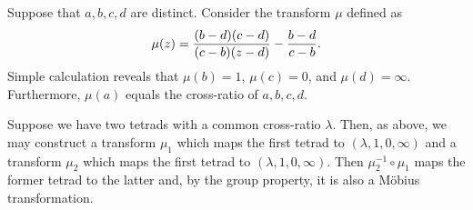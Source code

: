 \documentclass[12pt]{article}
\begin{document}
Suppose that $a,b,c,d$ are distinct.  Consider the transform $\mu$ defined as
\[
\mu (z) = {(b-d) (c-d) \over (c-b) (z-d)} - {b-d \over c-b} .
\]
Simple calculation reveals that $\mu (b) = 1$, $\mu (c) = 0$, and $\mu(d) = \infty$.
Furthermore, $\mu (a)$ equals the cross-ratio of $a,b,c,d$.

Suppose we have two tetrads with a common cross-ratio $\lambda$.  Then, as above, we may
construct a transform $\mu_1$ which maps the first tetrad to $(\lambda, 1, 0, \infty)$ and a 
transform $\mu_2$ which maps the first tetrad to $(\lambda, 1, 0, \infty)$.  Then $\mu_2^{-1} 
\circ \mu_1$ maps the former tetrad to the latter and, by the group property, it is also a
M\"obius transformation.

\end{document}

